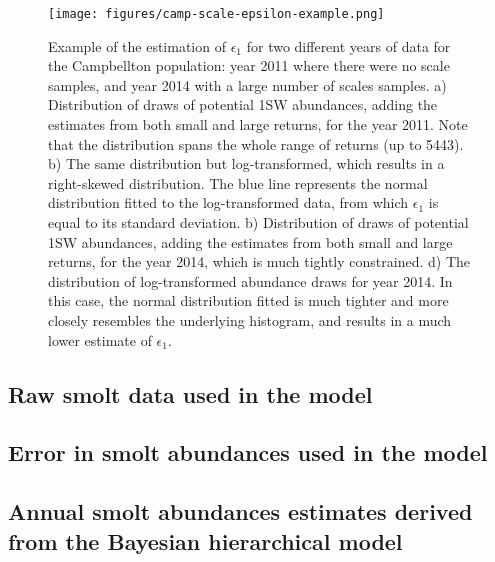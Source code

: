 \documentclass[12pt]{article}
\begin{document}
\begin{figure}[htbp] \centering
    \texttt{[image: figures/camp-scale-epsilon-example.png]} \caption{Example
        of the estimation of $\epsilon_{1}$ for two different years of data for the Campbellton population: year 2011 where
        there were no scale samples, and year 2014 with a large number of scales samples. a) Distribution of draws of potential
    1SW abundances, adding the estimates from both small and large returns, for the year 2011. Note that the distribution spans the whole range of
returns (up to 5443). b) The same distribution but log-transformed, which results in a right-skewed distribution. The blue line represents the normal
distribution fitted to the log-transformed data, from which $\epsilon_{1}$ is equal to its standard deviation. b) Distribution of draws of potential
    1SW abundances, adding the estimates from both small and large returns, for the year 2014, which is much tightly constrained. d) The distribution
of log-transformed abundance draws for year 2014. In this case, the normal distribution fitted is much tighter and more closely resembles the underlying histogram,
and results in a much lower estimate of $\epsilon_{1}$.}
    \label{fig:priors} 
\end{figure}

\clearpage



\clearpage



\clearpage



\clearpage

\subsection*{Raw smolt data used in the model}



\clearpage

\subsection*{Error in smolt abundances used in the model}



\clearpage

\subsection*{Annual smolt abundances estimates derived from the Bayesian hierarchical model}
\end{document}
